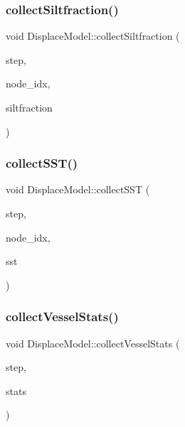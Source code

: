 \subsubsection{\texorpdfstring{collectSiltfraction()}{collectSiltfraction()}}
{\footnotesize\ttfamily void Displace\+Model\+::collect\+Siltfraction (\begin{DoxyParamCaption}\item[{int}]{step,  }\item[{int}]{node\+\_\+idx,  }\item[{double}]{siltfraction }\end{DoxyParamCaption})}

\mbox{\label{class_displace_model_a92c7598f47226a07dd8e35f48cb2e5a7}} 
\subsubsection{\texorpdfstring{collectSST()}{collectSST()}}
{\footnotesize\ttfamily void Displace\+Model\+::collect\+S\+ST (\begin{DoxyParamCaption}\item[{int}]{step,  }\item[{int}]{node\+\_\+idx,  }\item[{double}]{sst }\end{DoxyParamCaption})}

\mbox{\label{class_displace_model_a6a22d489ffb35325a05d9d6b8a89e81b}} 
\subsubsection{\texorpdfstring{collectVesselStats()}{collectVesselStats()}}
{\footnotesize\ttfamily void Displace\+Model\+::collect\+Vessel\+Stats (\begin{DoxyParamCaption}\item[{int}]{step,  }\item[{const \mbox{\hyperlink{class_vessel_stats}{Vessel\+Stats}} \&}]{stats }\end{DoxyParamCaption})}

\mbox{\label{class_displace_model_af9f659ec0f9c26a2293a1f860b1e38c9}} 
